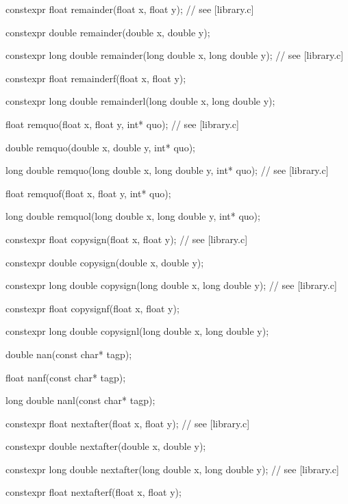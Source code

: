 \documentclass[prd,twocolumn,amsmath,amssymb,nofootinbib,eqsecnum]{revtex4-1}
\newcommand{\highlight}[1]{{\color{red} #1}}
\begin{document}
\begin{widetext}
{\highlight{constexpr} float remainder(float x, float y); // see [library.c]

\highlight{constexpr} double remainder(double x, double y);

\highlight{constexpr} long double remainder(long double x, long double y); // see [library.c]

\highlight{constexpr} float remainderf(float x, float y);

\highlight{constexpr} long double remainderl(long double x, long double y);

\vspace{2ex}

float remquo(float x, float y, int* quo); // see [library.c]

double remquo(double x, double y, int* quo);

long double remquo(long double x, long double y, int* quo); // see [library.c]

float remquof(float x, float y, int* quo);

long double remquol(long double x, long double y, int* quo);

\vspace{2ex}

\highlight{constexpr} float copysign(float x, float y); // see [library.c]

\highlight{constexpr} double copysign(double x, double y);

\highlight{constexpr} long double copysign(long double x, long double y); // see [library.c]

\highlight{constexpr} float copysignf(float x, float y);

\highlight{constexpr} long double copysignl(long double x, long double y);

\vspace{2ex}

double nan(const char* tagp);

float nanf(const char* tagp);

long double nanl(const char* tagp);

\vspace{2ex}

\highlight{constexpr}  float nextafter(float x, float y); // see [library.c]

\highlight{constexpr}  double nextafter(double x, double y);

\highlight{constexpr}  long double nextafter(long double x, long double y); // see [library.c]

\highlight{constexpr}  float nextafterf(float x, float y);

}
\end{widetext}
\end{document}
